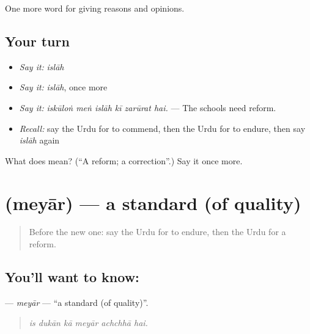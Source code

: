 \begin{grammarlens}[title={What you've built}]
One more word for giving reasons and opinions.
\end{grammarlens}

\subsection*{Your turn}
\begin{itemize}
\raggedright
  \item \emph{Say it:} \emph{islāh}
  \item \emph{Say it:} \emph{islāh}, once more
  \item \emph{Say it:} \emph{iskūloṅ meṅ islāh kī zarūrat hai.} — The schools need reform.
  \item \emph{Recall:} say the Urdu for to commend, then the Urdu for to endure, then say \emph{islāh} again
\end{itemize}

\begin{tcolorbox}[breakable,colback=teal!4,colframe=teal!35!black,title={Before you move on}]
What does  mean? (\textquotedblleft{}A reform; a correction\textquotedblright{}.) Say it once more.
\end{tcolorbox}
\section[\texorpdfstring{\ur{معیار} (meyār)}{معیار (meyār)}]{ (meyār) — a standard (of quality)}

\label{lesson:UR-C356-meyar}



\begin{quote}
Before the new one: say the Urdu for to endure, then the Urdu for a reform.
\end{quote}

\subsection*{You'll want to know: }
\textbf{} — \emph{meyār} — \textquotedblleft{}a standard (of quality)\textquotedblright{}.

\begin{quote}
     
\end{quote}

\begin{quote}
\emph{is dukān kā meyār achchhā hai.}
\end{quote}

